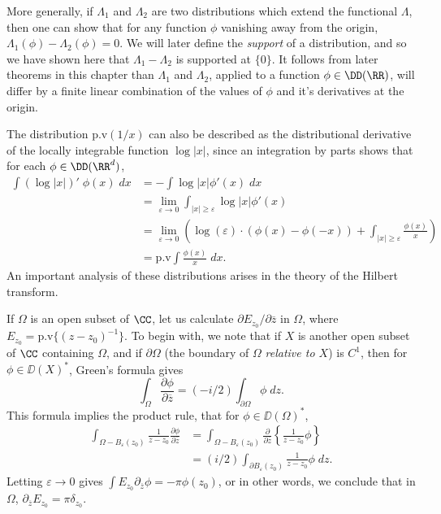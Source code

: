\begin{example}
    More generally, if $\Lambda_1$ and $\Lambda_2$ are two distributions which extend the functional $\Lambda$, then one can show that for any function $\phi$ vanishing away from the origin, $\Lambda_1(\phi) - \Lambda_2(\phi) = 0$. We will later define the \emph{support} of a distribution, and so we have shown here that $\Lambda_1 - \Lambda_2$ is supported at $\{ 0 \}$. It follows from later theorems in this chapter than $\Lambda_1$ and $\Lambda_2$, applied to a function $\phi \in \DD(\RR)$, will differ by a finite linear combination of the values of $\phi$ and it's derivatives at the origin.

    The distribution $\text{p.v}(1/x)$ can also be described as the distributional derivative of the locally integrable function $\log |x|$, since an integration by parts shows that for each $\phi \in \DD(\RR^d)$,
    \begin{align*}
        \int (\log |x|)'\; \phi(x)\; dx &= - \int \log |x| \phi'(x)\; dx\\
        &= \lim_{\varepsilon \to 0} \int_{|x| \geq \varepsilon} \log |x| \phi'(x)\\
        &= \lim_{\varepsilon \to 0} \left( \log(\varepsilon) \cdot \left( \phi(x) - \phi(-x) \right) + \int_{|x| \geq \varepsilon} \frac{\phi(x)}{x} \right)\\
        &= \text{p.v} \int \frac{\phi(x)}{x}\; dx.
    \end{align*}
    An important analysis of these distributions arises in the theory of the Hilbert transform.
\end{example}

\begin{example}
    If $\Omega$ is an open subset of $\CC$, let us calculate $\partial E_{z_0} / \partial \overline{z}$ in $\Omega$, where $E_{z_0} = \text{p.v} \{ (z - z_0)^{-1} \}$. To begin with, we note that if $X$ is another open subset of $\CC$ containing $\Omega$, and if $\partial \Omega$ (the boundary of $\Omega$ \emph{relative to $X$}) is $C^1$, then for $\phi \in \DD(X)^*$, Green's formula gives
    \[ \int_\Omega \frac{\partial \phi}{\partial \overline{z}} = (-i/2) \int_{\partial \Omega} \phi\; dz. \]
    This formula implies the product rule, that for $\phi \in \DD(\Omega)^*$,
    \begin{align*}
        \int_{\Omega - B_\varepsilon(z_0)} \frac{1}{z - z_0} \frac{\partial \phi}{\partial \overline{z}} &= \int_{\Omega - B_\varepsilon(z_0)} \frac{\partial}{\partial \overline{z}} \left\{ \frac{1}{z - z_0} \phi \right\}\\
        &= (i/2) \int_{\partial B_\varepsilon(z_0)} \frac{1}{z - z_0} \phi\; dz.
    \end{align*}
    Letting $\varepsilon \to 0$ gives $\int E_{z_0} \partial_{\overline{z}} \phi = - \pi \phi(z_0)$, or in other words, we conclude that in $\Omega$, $\partial_{\overline{z}} E_{z_0} = \pi \delta_{z_0}$.
\end{example}

